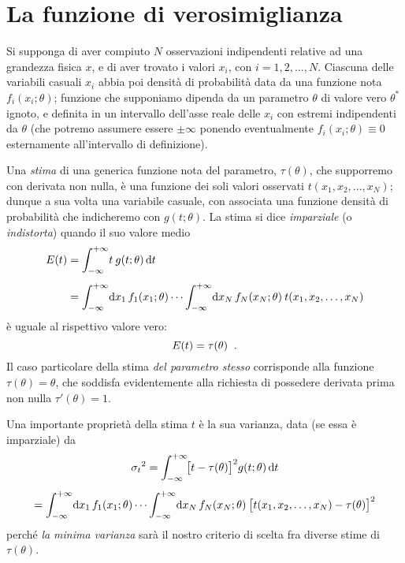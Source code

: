
\chapter{La funzione di verosimiglianza}%
\label{ch:e.maxlik}
Si supponga di aver compiuto $N$ osservazioni indipendenti
relative ad una grandezza fisica $x$, e di aver trovato i
valori $x_i$, con $i=1,2,\ldots,N$.  Ciascuna delle
variabili casuali $x_i$ abbia poi densit\`a di probabilit\`a
data da una funzione nota $ f_i (x_i ; \theta) $; funzione
che supponiamo dipenda da un parametro $\theta$ di valore
vero $\theta^*$ ignoto, e definita in un intervallo
dell'asse reale delle $x_i$ con estremi indipendenti da
$\theta$ (che potremo assumere essere $\pm \infty$ ponendo
eventualmente $ f_i (x_i ; \theta) \equiv 0$ esternamente
all'intervallo di definizione).

Una \emph{stima} di una generica funzione nota del
parametro, $\tau(\theta)$, che supporremo con derivata non
nulla, \`e una funzione dei soli valori osservati $t(x_1,
x_2,\ldots, x_N) $; dunque a sua volta una variabile
casuale, con associata una funzione densit\`a di
probabilit\`a che indicheremo con $g(t;\theta)$.  La stima
si dice \emph{imparziale}%
(o \emph{indistorta}) quando il suo valore medio
\begin{align*}
   E(t) &= \int_{-\infty}^{+\infty} \! t
     \: g(t;\theta) \, \de t \\[1ex]
   &= \int_{-\infty}^{+\infty} \! \de x_1
     \, f_1 (x_1;\theta) \cdots
     \int_{-\infty}^{+\infty} \! \de x_N \,
     f_N (x_N;\theta) \: t(x_1,x_2,\ldots,x_N)
\end{align*}
\`e uguale al rispettivo valore vero:
\begin{equation*}
  E(t) = \tau(\theta) \;\; .
\end{equation*}
Il caso particolare della stima \emph{del parametro stesso}
corrisponde alla funzione $\tau(\theta) = \theta$, che
soddisfa evidentemente alla richiesta di possedere derivata
prima non nulla $\tau'(\theta) = 1$.

Una importante propriet\`a della stima $t$ \`e la sua
varianza, data (se essa \`e imparziale) da
\begin{multline*}
   {\sigma_t}^2 = \int_{-\infty}^{+\infty} \!
     \bigl[ t - \tau(\theta) \bigr] ^2
     g(t;\theta) \, \de t \\[1ex]
   = \int_{-\infty}^{+\infty} \! \de x_1 \,
     f_1 (x_1;\theta) \cdots
     \int_{-\infty}^{+\infty} \! \de x_N \,
     f_N (x_N;\theta) \:
     \bigl[ t(x_1,x_2,\ldots,x_N) -
     \tau(\theta) \bigr] ^2
\end{multline*}
perch\'e \emph{la minima varianza} sar\`a il nostro criterio
di scelta fra diverse stime di $\tau(\theta)$.

